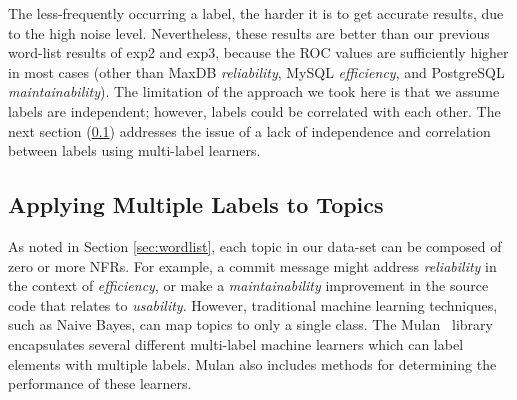 \documentclass[smallextended]{svjour3}       %
\begin{document}
The less-frequently occurring a label, the harder it is to get accurate
results, due to the high noise level. Nevertheless, these results are
better than our previous word-list results of \textsf{exp2} and
\textsf{exp3}, because the ROC values are sufficiently higher in most
cases (other than MaxDB \emph{reliability}, MySQL \emph{efficiency}, and PostgreSQL \emph{maintainability}). The
limitation of the approach we took here is that we assume labels are
independent; however, labels could be correlated with each other. 
The next section (\ref{sec:multilabel})
addresses the issue of a lack of independence and correlation between
labels
using multi-label learners.


\subsection{Applying Multiple Labels to Topics}
\label{sec:multilabel}

As noted in Section \ref{sec:wordlist}, each topic in our data-set can be composed of zero or more NFRs. 
For example, a commit message might address \textit{reliability} in the context of \textit{efficiency}, or make a \textit{maintainability} improvement
in the source code that relates to \textit{usability}. 
However, traditional machine learning techniques, such as Naive Bayes, can map topics to only a single class. 
The Mulan~\cite{mulan} library encapsulates several different multi-label machine learners which can label elements with multiple labels.
Mulan also includes methods for determining the performance of these learners.

\end{document}
